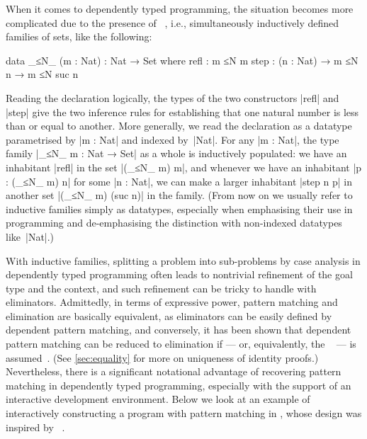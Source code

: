 When it comes to dependently typed programming, the situation becomes more complicated due to the presence of ~\citep{Dybjer-inductive-families}, i.e., simultaneously inductively defined families of sets, like the following:
\begin{code}
data _≤N_ (m : Nat) : Nat → Set where
  refl  : m ≤N m
  step  : (n : Nat) → m ≤N n → m ≤N suc n
\end{code}
Reading the declaration logically, the types of the two constructors |refl| and |step| give the two inference rules for establishing that one natural number is less than or equal to another.
More generally, we read the declaration as a datatype parametrised by |m : Nat|  and indexed by~|Nat|.
For any |m : Nat|, the type family |_≤N_ m : Nat → Set| as a whole is inductively populated: we have an inhabitant |refl| in the set |(_≤N_ m) m|, and whenever we have an inhabitant |p : (_≤N_ m) n| for some |n : Nat|, we can make a larger inhabitant |step n p| in another set |(_≤N_ m) (suc n)| in the family.
(From now on we usually refer to inductive families simply as datatypes, especially when emphasising their use in programming and de-emphasising the distinction with non-indexed datatypes like~|Nat|.)

With inductive families, splitting a problem into sub-problems by case analysis in dependently typed programming often leads to nontrivial refinement of the goal type and the context, and such refinement can be tricky to handle with eliminators.
Admittedly, in terms of expressive power, pattern matching and elimination are basically equivalent, as eliminators can be easily defined by dependent pattern matching, and conversely, it has been shown that dependent pattern matching can be reduced to elimination if  --- or, equivalently, the ~\citep{Streicher-ITT} --- is assumed~\citep{McBride-thesis, Goguen-elim}.
(See \autoref{sec:equality} for more on uniqueness of identity proofs.)
Nevertheless, there is a significant notational advantage of recovering pattern matching in dependently typed programming, especially with the support of an interactive development environment.
Below we look at an example of interactively constructing a program with pattern matching in \Agda, whose design was inspired by ~\citep{McBride-Epigram, McBride-view}.

